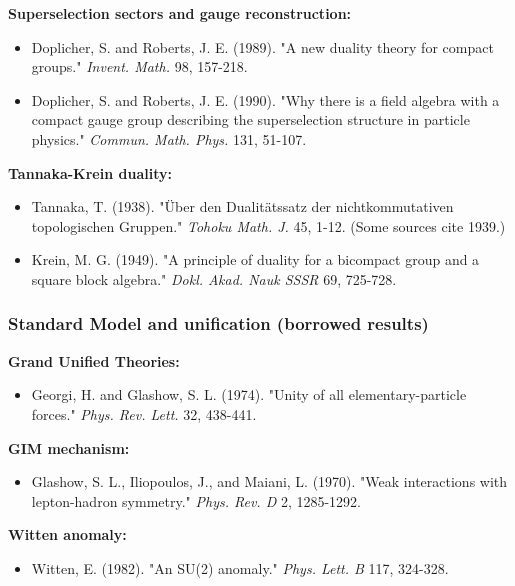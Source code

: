 \textbf{Superselection sectors and gauge reconstruction:}

\begin{itemize}
\tightlist
\item
  Doplicher, S. and Roberts, J. E. (1989). "A new duality theory for compact groups." \emph{Invent. Math.} 98, 157-218.
\item
  Doplicher, S. and Roberts, J. E. (1990). "Why there is a field algebra with a compact gauge group describing the superselection structure in particle physics." \emph{Commun. Math. Phys.} 131, 51-107.
\end{itemize}

\textbf{Tannaka-Krein duality:}

\begin{itemize}
\tightlist
\item
  Tannaka, T. (1938). "\"{U}ber den Dualit\"{a}tssatz der nichtkommutativen topologischen Gruppen." \emph{Tohoku Math. J.} 45, 1-12. (Some sources cite 1939.)
\item
  Krein, M. G. (1949). "A principle of duality for a bicompact group and a square block algebra." \emph{Dokl. Akad. Nauk SSSR} 69, 725-728.
\end{itemize}

\subsubsection{Standard Model and unification (borrowed results)}\label{standard-model-and-unification-borrowed-results}

\textbf{Grand Unified Theories:}

\begin{itemize}
\tightlist
\item
  Georgi, H. and Glashow, S. L. (1974). "Unity of all elementary-particle forces." \emph{Phys. Rev. Lett.} 32, 438-441.
\end{itemize}

\textbf{GIM mechanism:}

\begin{itemize}
\tightlist
\item
  Glashow, S. L., Iliopoulos, J., and Maiani, L. (1970). "Weak interactions with lepton-hadron symmetry." \emph{Phys. Rev. D} 2, 1285-1292.
\end{itemize}

\textbf{Witten anomaly:}

\begin{itemize}
\tightlist
\item
  Witten, E. (1982). "An SU(2) anomaly." \emph{Phys. Lett. B} 117, 324-328.
\end{itemize}

